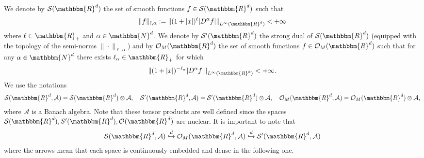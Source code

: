 \documentclass[11pt]{article}
\newcommand{\assign}{:=}
\begin{document}
\

We denote by $\mathcal{S} (\mathbbm{R}^d)$ the set of smooth functions $f \in
\mathcal{S} (\mathbbm{R}^d)$ such that
\[ \| f \|_{\ell, \alpha} \assign \| (1 + | x |)^{\ell} | D^{\alpha} f |
   \|_{L^{\infty} (\mathbbm{R}^d)} < + \infty \]
where $\ell \in \mathbbm{R}_+$ and $\alpha \in \mathbbm{N}^d$. We denote by
$\mathcal{S}' (\mathbbm{R}^d)$ the strong dual of $\mathcal{S} (\mathbbm{R}^d)$
(equipped with the topology of the semi-norms $\| \cdot \|_{\ell, \alpha}$)
and by $\mathcal{O}_M (\mathbbm{R}^d)$ the set of smooth functions $f \in
\mathcal{O}_M (\mathbbm{R}^d)$ such that for any $\alpha \in \mathbbm{N}^d$
there exists $\ell_{\alpha} \in \mathbbm{R}_+$ for which
\[ \| (1 + | x |)^{- \ell_{\alpha}} | D^{\alpha} f | \|_{L^{\infty}
   (\mathbbm{R}^d)} < + \infty . \]
We use the notations
\[ \mathcal{S} (\mathbbm{R}^d, \mathcal{A}) = \mathcal{S} (\mathbbm{R}^d)
   \otimes \mathcal{A}, \quad \mathcal{S}' (\mathbbm{R}^d, \mathcal{A}) =
   \mathcal{S}' (\mathbbm{R}^d) \otimes \mathcal{A}, \quad \mathcal{O}_M
   (\mathbbm{R}^d, \mathcal{A}) = \mathcal{O}_M (\mathbbm{R}^d) \otimes
   \mathcal{A}, \]
where $\mathcal{A}$ is a Banach algebra. Note that these tensor products are
well defined since the spaces $\mathcal{S} (\mathbbm{R}^d), S' (\mathbbm{R}^d),
\mathcal{O} (\mathbbm{R}^d)$ are nuclear. It is important to note that
\[ \mathcal{S} (\mathbbm{R}^d, \mathcal{A}) \overset{d}{\hookrightarrow}
   \mathcal{O}_M (\mathbbm{R}^d, \mathcal{A}) \overset{d}{\hookrightarrow}
   \mathcal{S}' (\mathbbm{R}^d, \mathcal{A}) \]
where the arrows mean that each space is continuously embedded and dense in
the following one.
\end{document}

